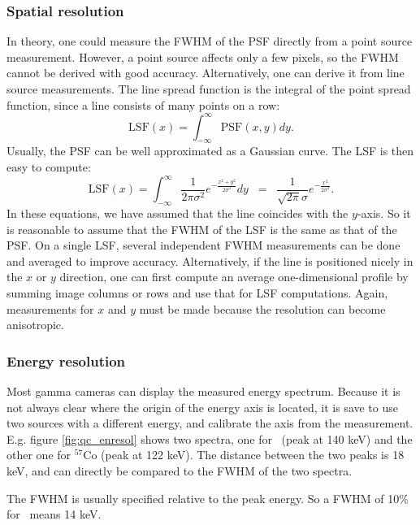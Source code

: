 \subsubsection{Spatial resolution}
In theory, one could measure the FWHM of the PSF directly from a point source
measurement. However, a point source affects only a few pixels, so the FWHM
cannot be derived with good accuracy. Alternatively, one can derive it from
line source measurements. The line spread function is the integral of the
point spread function, since a line consists of many points on a row:
\begin{equation}
  \mbox{LSF}(x) = \int_{-\infty}^{\infty} \mbox{PSF}(x,y) dy.
\end{equation}
Usually, the PSF can be well approximated as a Gaussian curve. The LSF is then
easy to compute:
\begin{equation}
  \mbox{LSF}(x)  =  \int_{-\infty}^{\infty} 
    \frac{1}{2 \pi \sigma^2} e^{- \frac{x^2 + y^2}{2 \sigma^2}} dy
 \;\; = \;\; \frac{1}{\sqrt{2 \pi} \sigma} e^{- \frac{x^2}{2 \sigma^2}}.
\end{equation}
In these equations, we have assumed that the line coincides with the
$y$-axis. So it is reasonable to assume that the FWHM of the LSF is the same
as that of the PSF.  On a single LSF, several independent FWHM measurements
can be done and averaged to improve accuracy. Alternatively, if the line is
positioned nicely in the $x$ or $y$ direction, one can first compute an
average one-dimensional profile by summing image columns or rows and use that
for LSF computations.  Again, measurements for $x$ and $y$ must be made
because the resolution can become anisotropic.

\subsubsection{Energy resolution}
Most gamma cameras can display the measured energy spectrum. Because it is not
always clear where the origin of the energy axis is located, it is save to use
two sources with a different energy, and calibrate the axis from the
measurement. E.g. figure \ref{fig:qc_enresol} shows two spectra, one for
\Tc\ (peak at 140 keV) and the other one for $^{57}$Co (peak at 122
keV). The distance between the two peaks is 18 keV, and can directly be
compared to the FWHM of the two spectra.

The FWHM is usually specified relative to the peak energy. So a FWHM of 10\%
for \Tc\ means 14 keV.

